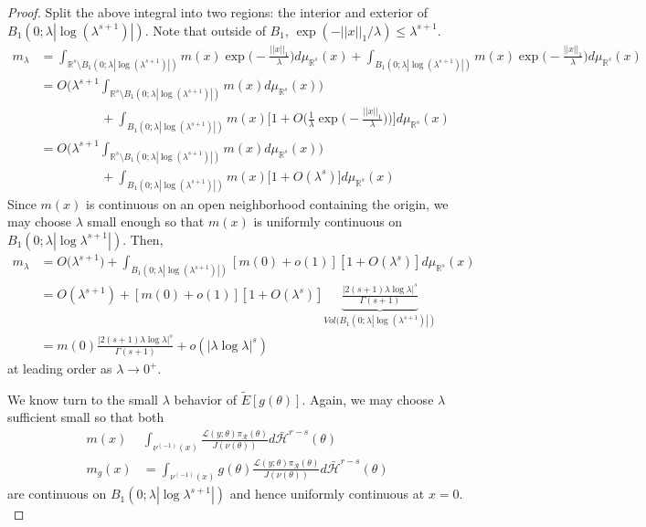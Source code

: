 \documentclass[10pt,fleqn]{article}
\DeclareMathOperator{\1}{\mathbbm{1}}
\begin{document}
{\begin{proof}
Split the above integral into two regions: the interior and exterior of $B_1(0;\lambda|\log(\lambda^{s+1})|)$. Note that outside of $B_1$, $\exp(-||x||_1/\lambda) \le \lambda^{s+1}.$
\begin{align*}
m_\lambda &= \int_{\mathbb{R}^s \setminus B_1(0;\lambda|\log(\lambda^{s+1})|)}m(x) \exp\bigg(-\frac{||x||_1}{\lambda}\bigg)d\mu_{\mathbb{R}^s}(x) + \int_{B_1(0;\lambda|\log(\lambda^{s+1})|)}m(x) \exp\bigg(-\frac{||x||_1}{\lambda}\bigg)d\mu_{\mathbb{R}^s}(x) \\
&=O\bigg( \lambda^{s+1} \int_{\mathbb{R}^s \setminus B_1(0;\lambda|\log(\lambda^{s+1})|)}m(x) d\mu_{\mathbb{R}^s}(x)\bigg) \\
&\hspace{2cm}+ \int_{B_1(0;\lambda|\log(\lambda^{s+1})|)} m(x) \bigg[1+O\bigg(\frac{1}{\lambda}\exp\bigg(-\frac{||x||_1}{\lambda}\bigg)\bigg)\bigg]d\mu_{\mathbb{R}^s}(x) \\
&=O\bigg( \lambda^{s+1} \int_{\mathbb{R}^s \setminus B_1(0;\lambda|\log(\lambda^{s+1})|)}m(x) d\mu_{\mathbb{R}^s}(x)\bigg) \\
&\hspace{2cm}+ \int_{B_1(0;\lambda|\log(\lambda^{s+1})|)} m(x) \bigg[1+O(\lambda^s) \bigg]d\mu_{\mathbb{R}^s}(x)
\end{align*}
Since $m(x)$ is continuous on an open neighborhood containing the origin, we may choose $\lambda$ small enough so that $m(x)$ is uniformly continuous on $B_1(0;\lambda |\log \lambda^{s+1}|).$ Then, 
\begin{align*}
m_\lambda&= O\bigg( \lambda^{s+1} \bigg) + \int_{B_1(0;\lambda|\log(\lambda^{s+1})|)} [m(0) + o(1)][1+O(\lambda^s)] d\mu_{\mathbb{R}^s} (x) \\
&= O(\lambda^{s+1}) + [m(0)+o(1)][1+ O(\lambda^s)] \underbrace{\frac{|2(s+1)\lambda \log \lambda |^s}{\Gamma(s+1)}}_{Vol(B_1(0;\lambda|\log(\lambda^{s+1})|)}   \\
&= m(0) \frac{|2(s+1)\lambda \log \lambda |^s}{\Gamma(s+1)} + o(|\lambda \log \lambda|^s) 
\end{align*}
at leading order as $\lambda\to 0^+$.


We know turn to the small $\lambda$ behavior of $\tilde{E}[g(\theta)].$  Again, we may choose $\lambda$ sufficient small so that both
\begin{align*}
m(x)& \int_{\nu^{(-1)}(x)} \frac{\mathcal{L}(y;\theta)\pi_\mathcal{R}(\theta)}{J(\nu(\theta))} d\bar{\mathcal{H}}^{r-s}(\theta)   \\
m_g(x)&= \int_{\nu^{(-1)}(x)} g(\theta) \frac{\mathcal{L}(y;\theta)\pi_\mathcal{R}(\theta)}{J(\nu(\theta))} d\bar{\mathcal{H}}^{r-s}(\theta) 
\end{align*}
are continuous on $B_1(0;\lambda|\log \lambda^{s+1}|)$ and hence uniformly continuous at $x=0.$ 


\end{proof}}
\end{document}
